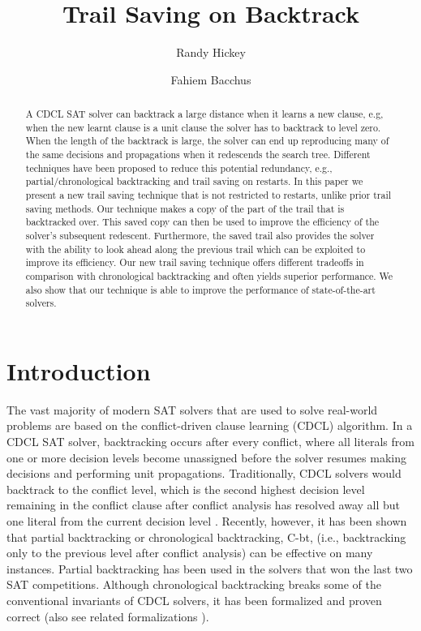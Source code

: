 \documentclass[runningheads]{llncs}
\title{Trail Saving on Backtrack}
\author{Randy Hickey \and Fahiem Bacchus}
\institute{Department of Computer Science, University of Toronto, Canada\\
  \email{rgh000@gmail.com, fbacchus@cs.toronto.edu}}
\newcommand{\sat}{SAT\xspace}
\newcommand{\cbt}{C-bt\xspace}
\begin{document}
\maketitle
\begin{abstract}
    A CDCL \sat solver can backtrack a large distance when it learns a
    new clause, e.g, when the new learnt clause is a unit clause the
    solver has to backtrack to level zero. When the length of the
    backtrack is large, the solver can end up reproducing many of the
    same decisions and propagations when it redescends the search
    tree. Different techniques have been proposed to reduce this
    potential redundancy, e.g., partial/chronological backtracking and
    trail saving on restarts. In this paper we present a new trail
    saving technique that is not restricted to restarts, unlike prior
    trail saving methods. Our technique makes a copy of the part of
    the trail that is backtracked over. This saved copy can then be
    used to improve the efficiency of the solver's subsequent
    redescent. Furthermore, the saved trail also provides the solver
    with the ability to look ahead along the previous trail which can
    be exploited to improve its efficiency. Our new trail saving
    technique offers different tradeoffs in comparison with
    chronological backtracking and often yields superior performance.
    We also show that our technique is able to improve the performance
    of state-of-the-art solvers.
\end{abstract}

\section{Introduction}
The vast majority of modern SAT solvers that are used to solve
real-world problems are based on the conflict-driven clause learning
(CDCL) algorithm. In a CDCL SAT solver, backtracking occurs after
every conflict, where all literals from one or more decision levels
become unassigned before the solver resumes making decisions and
performing unit propagations. Traditionally, CDCL solvers would
backtrack to the conflict level, which is the second highest decision
level remaining in the conflict clause after conflict analysis has
resolved away all but one literal from the current decision level
\cite{DBLP:conf/dac/MoskewiczMZZM01}. Recently, however, it has been
shown that partial backtracking \cite{DBLP:conf/lpar/JiangZ13} or
chronological backtracking, \cbt, (i.e., backtracking only to the
previous level after conflict analysis)
\cite{DBLP:conf/sat/NadelR18,DBLP:conf/sat/MohleB19} can be effective
on many instances. Partial backtracking has been used in the solvers
that won the last two SAT competitions. Although chronological
backtracking breaks some of the conventional invariants of CDCL
solvers, it has been formalized and proven correct
\cite{DBLP:conf/sat/MohleB19} (also see related formalizations 
\cite{DBLP:journals/jacm/NieuwenhuisOT06,nadelPhD}).
\end{document}
